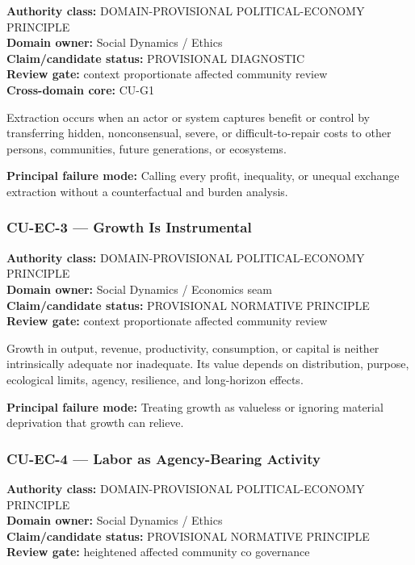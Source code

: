 \documentclass[
  11pt,
]{article}
\begin{document}
\textbf{Authority class:} DOMAIN-PROVISIONAL POLITICAL-ECONOMY
PRINCIPLE\\
\textbf{Domain owner:} Social Dynamics / Ethics\\
\textbf{Claim/candidate status:} PROVISIONAL DIAGNOSTIC\\
\textbf{Review gate:} context proportionate affected community review\\
\textbf{Cross-domain core:} CU-G1

Extraction occurs when an actor or system captures benefit or control by
transferring hidden, nonconsensual, severe, or difficult-to-repair costs
to other persons, communities, future generations, or ecosystems.

\textbf{Principal failure mode:} Calling every profit, inequality, or
unequal exchange extraction without a counterfactual and burden
analysis.

\subsubsection{CU-EC-3 --- Growth Is
Instrumental}\label{cu-ec-3-growth-is-instrumental}

\textbf{Authority class:} DOMAIN-PROVISIONAL POLITICAL-ECONOMY
PRINCIPLE\\
\textbf{Domain owner:} Social Dynamics / Economics seam\\
\textbf{Claim/candidate status:} PROVISIONAL NORMATIVE PRINCIPLE\\
\textbf{Review gate:} context proportionate affected community review

Growth in output, revenue, productivity, consumption, or capital is
neither intrinsically adequate nor inadequate. Its value depends on
distribution, purpose, ecological limits, agency, resilience, and
long-horizon effects.

\textbf{Principal failure mode:} Treating growth as valueless or
ignoring material deprivation that growth can relieve.

\subsubsection{CU-EC-4 --- Labor as Agency-Bearing
Activity}\label{cu-ec-4-labor-as-agency-bearing-activity}

\textbf{Authority class:} DOMAIN-PROVISIONAL POLITICAL-ECONOMY
PRINCIPLE\\
\textbf{Domain owner:} Social Dynamics / Ethics\\
\textbf{Claim/candidate status:} PROVISIONAL NORMATIVE PRINCIPLE\\
\textbf{Review gate:} heightened affected community co governance
\end{document}
